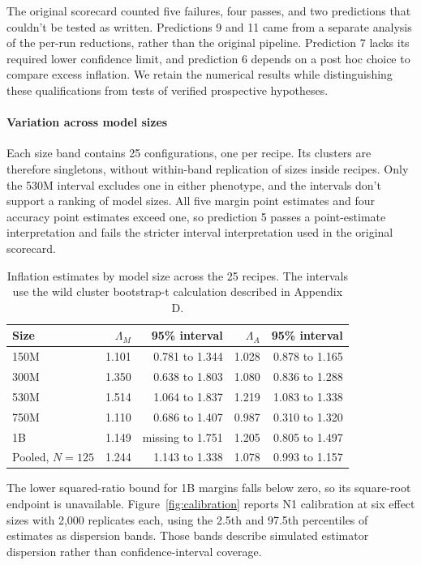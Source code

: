 The original scorecard counted five failures, four passes, and two predictions that couldn't be tested as written. Predictions 9 and 11 came from a separate analysis of the per-run reductions, rather than the original pipeline. Prediction 7 lacks its required lower confidence limit, and prediction 6 depends on a post hoc choice to compare excess inflation. We retain the numerical results while distinguishing these qualifications from tests of verified prospective hypotheses.

\paragraph{Variation across model sizes}
Each size band contains 25 configurations, one per recipe. Its clusters are therefore singletons, without within-band replication of sizes inside recipes. Only the 530M interval excludes one in either phenotype, and the intervals don't support a ranking of model sizes. All five margin point estimates and four accuracy point estimates exceed one, so prediction 5 passes a point-estimate interpretation and fails the stricter interval interpretation used in the original scorecard.

\begin{table}[htbp]
\centering\small
\caption{Inflation estimates by model size across the 25 recipes. The intervals use the wild cluster bootstrap-t calculation described in Appendix D.}
\label{tab:original7}
\begin{tabular}{lrrrr}\hline
Size & $\Lambda_M$ & 95\% interval & $\Lambda_A$ & 95\% interval\\\hline
150M & 1.101 & 0.781 to 1.344 & 1.028 & 0.878 to 1.165\\
300M & 1.350 & 0.638 to 1.803 & 1.080 & 0.836 to 1.288\\
530M & 1.514 & 1.064 to 1.837 & 1.219 & 1.083 to 1.338\\
750M & 1.110 & 0.686 to 1.407 & 0.987 & 0.310 to 1.320\\
1B & 1.149 & missing to 1.751 & 1.205 & 0.805 to 1.497\\
Pooled, $N=125$ & 1.244 & 1.143 to 1.338 & 1.078 & 0.993 to 1.157\\\hline
\end{tabular}
\end{table}

The lower squared-ratio bound for 1B margins falls below zero, so its square-root endpoint is unavailable. Figure~\ref{fig:calibration} reports N1 calibration at six effect sizes with 2,000 replicates each, using the 2.5th and 97.5th percentiles of estimates as dispersion bands. Those bands describe simulated estimator dispersion rather than confidence-interval coverage.

